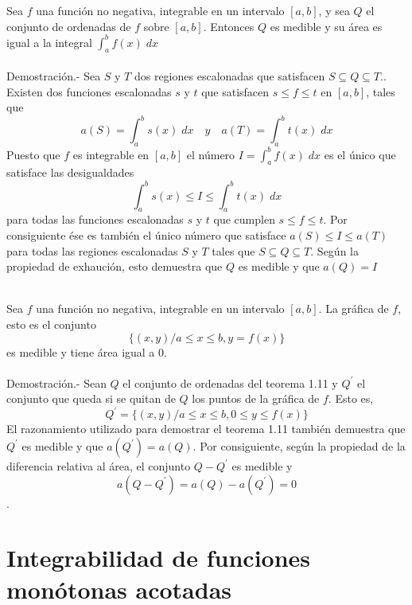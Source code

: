 \begin{multicols}{2}
\begin{teo}
    Sea $f$ una función no negativa, integrable en un intervalo $[a,b]$, y sea $Q$ el conjunto de ordenadas de $f$ sobre $[a,b]$. Entonces $Q$ es medible y su área es igual a la integral $\int_a^b f(x) \; dx$\\\\
    Demostración.-\; Sea $S$ y $T$ dos regiones escalonadas que satisfacen $S\subseteq Q \subseteq T.$. Existen dos funciones escalonadas $s$ y $t$ que satisfacen $s\leq f\leq t$ en $[a,b]$, tales que $$a(S)=\int_a^b s(x) \; dx \quad y \quad a(T)=\int_a^b t(x) \; dx$$
    Puesto que $f$ es integrable en $[a,b]$ el número $I=\int_a^b f(x) \; dx$ es el único que satisface las desigualdades $$\int_a^b s(x) \leq I \leq \int_a^b t(x) \; dx$$
    para todas las funciones escalonadas $s$ y $t$ que cumplen $s\leq f \leq t$. Por consiguiente ése es también el único número que satisface $a(S)\leq I \leq a(T)$ para todas las regiones escalonadas $S$ y $T$ tales que $S\subseteq Q \subseteq T.$ Según la propiedad de exhaución, esto demuestra que $Q$ es medible y que $a(Q)=I$\\\\
\end{teo}

\begin{teo}
    Sea $f$ una función no negativa, integrable en un intervalo $[a,b]$. La gráfica de $f$, esto es el conjunto $$\lbrace (x,y)/a\leq x \leq b, y=f(x) \rbrace$$ es medible y tiene área igual a $0$.\\\\
    Demostración.-\; Sean $Q$ el conjunto de ordenadas del teorema 1.11 y $Q^{'}$ el conjunto que queda si se quitan de $Q$ los puntos de la gráfica de $f$. Esto es, $$Q^{'} = \lbrace (x,y)/a\leq x \leq b, 0\leq y \leq f(x)\rbrace$$
    El razonamiento utilizado para demostrar el teorema 1.11 también demuestra que $Q^{'}$ es medible y que $a(Q^{'}) = a(Q)$. Por consiguiente, según la propiedad de la diferencia relativa al área, el conjunto $Q-Q^{'}$ es medible y $$a(Q-Q^{'})=a(Q)-a(Q^{'})=0$$.
\end{teo}


\section*{Integrabilidad de funciones monótonas acotadas}


\end{multicols}
